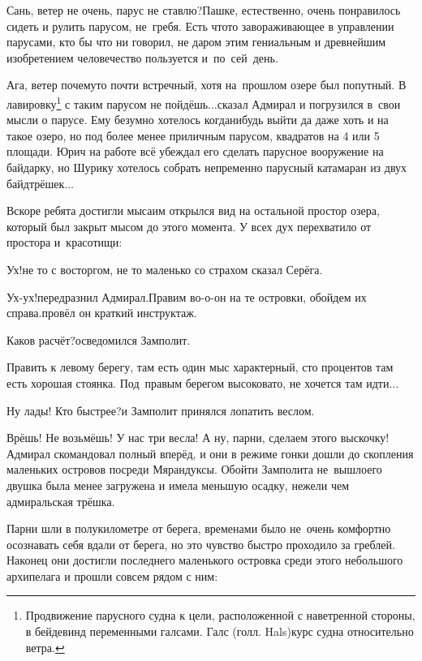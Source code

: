 \diagdash Сань, ветер не очень, парус не ставлю?\mdash Пашке, естественно, очень понравилось сидеть и рулить парусом, не~гребя. Есть что\sdash то завораживающее в управлении парусами, кто бы что ни говорил, не даром этим гениальным и древнейшим изобретением человечество пользуется и~по~сей~день.

\renewcommand*{\thefootnote}{\fnsymbol{footnote}}
\setcounter{footnote}{0}
\diagdash Ага, ветер почему\sdash то почти встречный, хотя на~прошлом озере был попутный. В лавировку\footnote{Продвижение парусного судна к цели, расположенной с наветренной стороны, в бейдевинд переменными галсами. Галс (голл. Hals)\mdash курс судна относительно ветра\cite{МорскойСправочник}.} с таким парусом не пойдёшь$\ldots$\mdash сказал Адмирал и погрузился в~свои мысли о парусе. Ему безумно хотелось когда\sdash нибудь выйти да даже хоть и на такое озеро, но под более менее приличным парусом, квадратов на 4 или 5 площади. Юрич на работе всё убеждал его сделать парусное вооружение на байдарку, но Шурику хотелось собрать непременно парусный катамаран из двух байд\sdash трёшек$\ldots$

Вскоре ребята достигли мыса\mdash им открылся вид на остальной простор озера, который был закрыт мысом до этого момента. У всех дух перехватило от простора и~красотищи:

\diagdash Ух!\mdash не то с восторгом, не то маленько со страхом сказал Серёга.

\diagdash Ух-ух!\mdash передразнил Адмирал.\mdash Правим во-о-он на те островки, обойдем их справа.\mdash провёл он краткий инструктаж.

\diagdash Каков расчёт?\mdash осведомился Замполит.

\diagdash Править к левому берегу, там есть один мыс характерный, сто процентов там есть хорошая стоянка. Под~правым берегом высоковато, не хочется там идти$\ldots$

\diagdash Ну лады! Кто быстрее?\mdash и Замполит принялся лопатить веслом.

\diagdash Врёшь! Не возьмёшь! У нас три весла! А ну, парни, сделаем этого выскочку!\mdash Адмирал скомандовал полный вперёд, и они в режиме гонки дошли до скопления маленьких островов посреди Мярандуксы. Обойти Замполита не~вышло\mdash его двушка была менее загружена и имела меньшую осадку, нежели чем адмиральская трёшка. 

Парни шли в полукилометре от берега, временами было не~очень комфортно осознавать себя вдали от берега, но это чувство быстро проходило за греблей. Наконец они достигли последнего маленького островка среди этого небольшого архипелага и прошли совсем рядом с ним:

